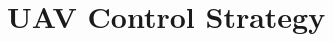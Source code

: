 \documentclass[letterpaper, 10 pt, conference]{ieeeconf}
\begin{document}
\section{UAV Control Strategy}\label{sec:UAVControl}
%
%
%
%
%
\end{document}
